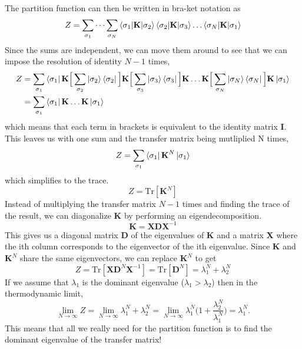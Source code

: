 \documentclass{article}
\newcommand{\be}{\begin{equation}}
\newcommand{\ee}{\end{equation}}
\newcommand{\tk}{\textbf{K}}
\newcommand{\ti}{\textbf{I}}
\begin{document}
The partition function can then be written in bra-ket notation as
\be
  Z = \sum_{\sigma_1} \dots \sum_{\sigma_N} \braket{\sigma_1 | \tk | \sigma_2} \braket{\sigma_2 | \tk | \sigma_3} \dots \braket{\sigma_N | \tk | \sigma_1}
\ee
Since the sums are independent, we can move them around to see that we can impose the resolution of identity $N - 1$ times,
\be
  \begin{split}
    Z &= \sum_{\sigma_1} \bra{\sigma_1} \tk \Big[ \sum_{\sigma_2} \ket{\sigma_2} \bra{\sigma_2} \Big] \tk \Big[ \sum_{\sigma_3} \ket{\sigma_3} \bra{\sigma_3} \Big] \tk \dots \tk \Big[ \sum_{\sigma_N} \ket{\sigma_N} \bra{\sigma_N} \Big] \tk \ket{\sigma_1} \\
    &= \sum_{\sigma_1} \bra{\sigma_1} \tk \dots \tk \ket{\sigma_1}
  \end{split}
\ee
which means that each term in brackets is equivalent to the identity matrix \ti.
This leaves us with one sum and the transfer matrix being mutliplied N times,
\be
  Z = \sum_{\sigma_1} \bra{\sigma_1} \tk^N \ket{\sigma_1}
\ee
which simplifies to the trace.
\be
  Z = \text{Tr}[\tk^N]
\ee
Instead of multiplying the transfer matrix $N - 1$ times and finding the trace of the result, we can diagonalize \textbf{K} by performing an eigendecomposition.
\be
  \tk = \textbf{X} \textbf{D} \textbf{X}^{-1}
\ee
This gives us a diagonal matrix \textbf{D} of the eigenvalues of \textbf{K} and a matrix \textbf{X} where the ith column corresponds to the eigenvector of the ith eigenvalue.
Since \textbf{K} and $\tk^N$ share the same eigenvectors, we can replace $\tk^N$ to get
\be
  Z = \text{Tr}[\textbf{X} \textbf{D}^N \textbf{X}^{-1}] = \text{Tr}[\textbf{D}^N] = \lambda_1^N + \lambda_2^N
\ee
If we assume that $\lambda_1$ is the dominant eigenvalue ($\lambda_1 > \lambda_2$) then in the thermodynamic limit,
\be
  \lim_{N \to \infty} Z = \lim_{N \to \infty} \lambda_1^N + \lambda_2^N = \lim_{N \to \infty} \lambda_1^N \Big(1 + \frac{\lambda_2^N}{\lambda_1^N} \Big)  = \lambda_1^N .
\ee
This means that all we really need for the partition function is to find the dominant eigenvalue of the transfer matrix!
\end{document}
